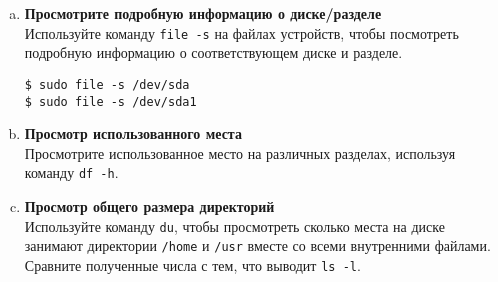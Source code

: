 \documentclass{article}
\begin{document}
\begin{enumerate}[a.]
\item \textbf{Просмотрите подробную информацию о диске/разделе}\\
Используйте команду \texttt{file -s} на файлах устройств, чтобы посмотреть подробную информацию о соответствующем диске и разделе.
\begin{lstlisting}
$ sudo file -s /dev/sda
$ sudo file -s /dev/sda1
\end{lstlisting}

\item \textbf{Просмотр использованного места}\\
Просмотрите использованное место на различных разделах, используя команду \texttt{df -h}.

\item \textbf{Просмотр общего размера директорий}\\
Используйте команду \texttt{du}, чтобы просмотреть сколько места на диске занимают директории \texttt{/home} и \texttt{/usr} вместе со всеми внутренними файлами. Сравните полученные числа с тем, что выводит \texttt{ls -l}.

\end{enumerate}


\newpage
\end{document}
